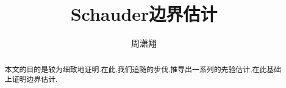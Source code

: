\documentclass[12pt,A4paper,reqno]{amsart}
\numberwithin{equation}{section}
\theoremstyle{plain}
\theoremstyle{plain}
\theoremstyle{plain}
\numberwithin{equation}{section}
\theoremstyle{remark}
\begin{document}
\title[]{\LARGE S\MakeLowercase {chauder}边界估计}


\author[]{\large 周潇翔}
\address{School of Mathematical Sciences\\
University of Science and Technology of China\\
Hefei, 230026\\ P.R. China\\}
\maketitle




\begin{abstract}
本文的目的是较为细致地证明\cite[定理3.1]{周蜀林2019Schauder}.在此,我们追随\cite{周蜀林2019Schauder}的步伐,推导出一系列的先验估计,在此基础上证明边界估计.
\end{abstract}




\end{document}

